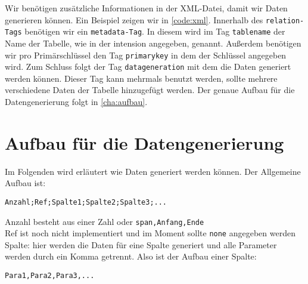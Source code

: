 \documentclass[11pt]{report}
\begin{document}
Wir benötigen zusätzliche Informationen in der XML-Datei, damit wir Daten generieren können. Ein Beispiel zeigen wir in \autoref{code:xml}. Innerhalb des \texttt{relation-Tags} benötigen wir ein \texttt{metadata-Tag}. In diesem wird im Tag \texttt{tablename} der Name der Tabelle, wie in der intension angegeben, genannt. Außerdem benötigen wir pro Primärschlüssel den Tag \texttt{primarykey} in dem der Schlüssel angegeben wird. Zum Schluss folgt der Tag \texttt{datageneration} mit dem die Daten generiert werden können. Dieser Tag kann mehrmals benutzt werden, sollte mehrere verschiedene Daten der Tabelle hinzugefügt werden. Der genaue Aufbau für die Datengenerierung folgt in \autoref{cha:aufbau}.

\begin{figure}[h]
	\centering
	\begin{minipage}{0.9\textwidth}
		
	\end{minipage}
\end{figure}


\section{Aufbau für die Datengenerierung}
\label{cha:aufbau}

Im Folgenden wird erläutert wie Daten generiert werden können. Der Allgemeine Aufbau ist:

\texttt{Anzahl;Ref;Spalte1;Spalte2;Spalte3;...}

\bigskip\noindent
Anzahl besteht aus einer Zahl oder \texttt{span,Anfang,Ende}\\
Ref ist noch nicht implementiert und im Moment sollte \texttt{none} angegeben werden\\
Spalte: hier werden die Daten für eine Spalte generiert und alle Parameter werden durch ein Komma getrennt. Also ist der Aufbau einer Spalte:

\texttt{Para1,Para2,Para3,...}
\end{document}
